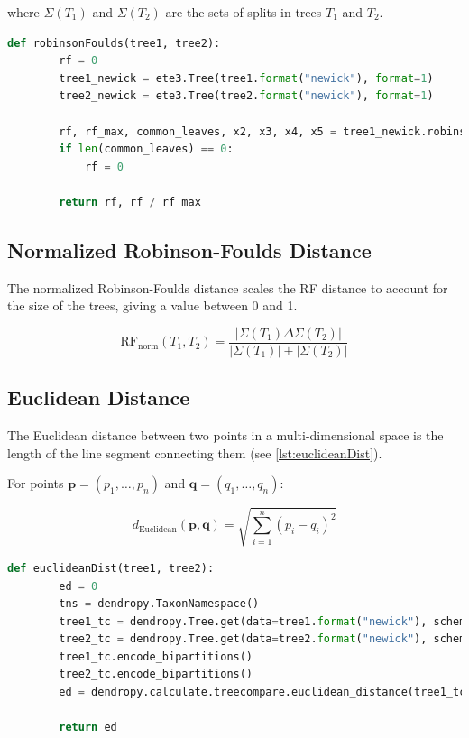 where \( \Sigma(T_1) \) and \( \Sigma(T_2) \) are the sets of splits in trees \( T_1 \) and \( T_2 \).

\begin{lstlisting}[label=lst:robinsonFoulds,language=Python,caption=Python script for calculating the Robinson-Foulds distance using the ete3 package in aPhyloGeo package]
    def robinsonFoulds(tree1, tree2):
        rf = 0
        tree1_newick = ete3.Tree(tree1.format("newick"), format=1)
        tree2_newick = ete3.Tree(tree2.format("newick"), format=1)

        rf, rf_max, common_leaves, x2, x3, x4, x5 = tree1_newick.robinson_foulds(tree2_newick, unrooted_trees=True)
        if len(common_leaves) == 0:
            rf = 0

        return rf, rf / rf_max
\end{lstlisting}


\subsection{Normalized Robinson-Foulds Distance}\label{RFnorm}
The normalized Robinson-Foulds distance scales the RF distance to account for the size of the trees, giving a value between 0 and 1.

\[ \text{RF}_{\text{norm}}(T_1, T_2) = \frac{| \Sigma(T_1) \Delta \Sigma(T_2) |}{| \Sigma(T_1) | + | \Sigma(T_2) |} \]

\subsection{Euclidean Distance}\label{euclidean}
The Euclidean distance between two points in a multi-dimensional space is the length of the line segment connecting them (see \autoref{lst:euclideanDist}).

For points \( \mathbf{p} = (p_1, \ldots, p_n) \) and \( \mathbf{q} = (q_1, \ldots, q_n) \):

\[ d_{\text{Euclidean}}(\mathbf{p}, \mathbf{q}) = \sqrt{\sum_{i=1}^{n} (p_i - q_i)^2} \]

\begin{lstlisting}[label=lst:euclideanDist,language=Python,caption=Python script for calculating the Euclidean distance distance using the ete3 package in aPhyloGeo package]
    def euclideanDist(tree1, tree2):
        ed = 0
        tns = dendropy.TaxonNamespace()
        tree1_tc = dendropy.Tree.get(data=tree1.format("newick"), schema="newick", taxon_namespace=tns)
        tree2_tc = dendropy.Tree.get(data=tree2.format("newick"), schema="newick", taxon_namespace=tns)
        tree1_tc.encode_bipartitions()
        tree2_tc.encode_bipartitions()
        ed = dendropy.calculate.treecompare.euclidean_distance(tree1_tc, tree2_tc)

        return ed
\end{lstlisting}

